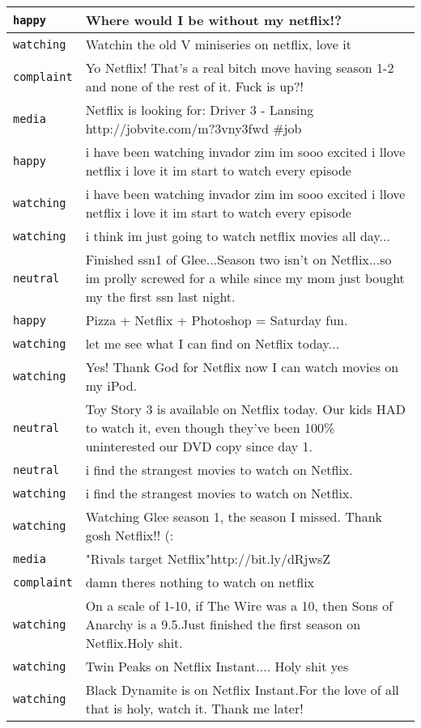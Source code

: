 {\begin{longtable}{|l|p{160mm}|}
      \tabularnewline\hline
         \texttt{happy} & Where would I be without my netflix!?
      \tabularnewline\hline
         \texttt{watching} & Watchin the old V miniseries on netflix, love it
      \tabularnewline\hline
         \texttt{complaint} & Yo Netflix! That's a real bitch move having season 1-2 and none of the rest of it. Fuck is up?!
      \tabularnewline\hline
         \texttt{media} & Netflix is looking for: Driver 3 - Lansing http://jobvite.com/m?3vny3fwd \#job
      \tabularnewline\hline
         \texttt{happy} & i have been watching invador zim im sooo excited i llove netflix i love it im start to watch every episode
      \tabularnewline\hline
         \texttt{watching} & i have been watching invador zim im sooo excited i llove netflix i love it im start to watch every episode
      \tabularnewline\hline
         \texttt{watching} & i think im just going to watch netflix movies all day...
      \tabularnewline\hline
         \texttt{neutral} & Finished ssn1 of Glee...Season two isn't on Netflix...so im prolly screwed for a while since my mom just bought my the first ssn last night.
      \tabularnewline\hline
         \texttt{happy} & Pizza + Netflix + Photoshop = Saturday fun.
      \tabularnewline\hline
         \texttt{watching} & let me see what I can find on Netflix today...
      \tabularnewline\hline
         \texttt{watching} & Yes! Thank God for Netflix now I can watch movies on my iPod.
      \tabularnewline\hline
         \texttt{neutral} & Toy Story 3 is available on Netflix today. Our kids HAD to watch it, even though they've been 100\% uninterested our DVD copy since day 1.
      \tabularnewline\hline
         \texttt{neutral} & i find the strangest movies to watch on Netflix.
      \tabularnewline\hline
         \texttt{watching} & i find the strangest movies to watch on Netflix.
      \tabularnewline\hline
         \texttt{watching} & Watching Glee season 1, the season I missed. Thank gosh Netflix!! (:
      \tabularnewline\hline
         \texttt{media} & "Rivals target Netflix"http://bit.ly/dRjwsZ
      \tabularnewline\hline
         \texttt{complaint} & damn theres nothing to watch on netflix
      \tabularnewline\hline
         \texttt{watching} & On a scale of 1-10, if The Wire was a 10, then Sons of Anarchy is a 9.5.Just finished the first season on Netflix.Holy shit.
      \tabularnewline\hline
         \texttt{watching} & Twin Peaks on Netflix Instant.... Holy shit yes
      \tabularnewline\hline
         \texttt{watching} & Black Dynamite is on Netflix Instant.For the love of all that is holy, watch it. Thank me later!

\end{longtable}}
